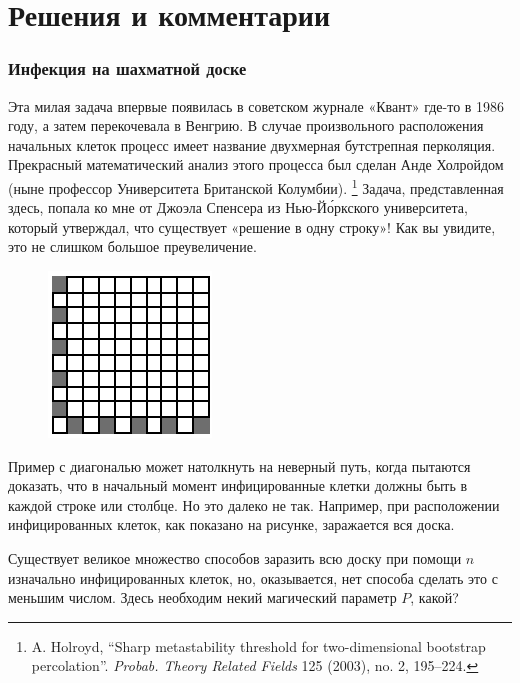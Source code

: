 \section*{Решения и комментарии}

\subsubsection*{Инфекция на шахматной доске}%

Эта милая задача впервые появилась в советском журнале «Квант» %
где-то в 1986 году, а затем перекочевала в Венгрию.
В случае произвольного расположения начальных клеток процесс имеет название двухмерная бутстрепная перколяция.
Прекрасный математический анализ этого процесса был сделан Анде Холройдом (ныне профессор Университета Британской Колумбии).%
\footnote{A. Holroyd, ``Sharp metastability threshold for two-dimensional bootstrap percolation''. \emph{Probab. Theory Related Fields} 125 (2003), no. 2, 195--224.}
Задача, представленная здесь, попала ко мне от Джоэла Спенсера %
из Нью-Й\'{о}ркского университета, который утверждал, что существует «решение в одну строку»!
Как вы увидите, это не слишком большое преувеличение.

\begin{figure}
\vskip-3mm
\centering
\includegraphics[scale=1.5]{Figs/Algorithms/sick}
\end{figure}

\medskip

Пример с диагональю может натолкнуть на неверный путь, когда пытаются доказать, что в начальный момент инфицированные клетки должны быть в каждой строке или столбце.
Но это далеко не так.
Например, при расположении инфицированных клеток, как показано на рисунке, заражается вся доска.


Существует великое множество способов заразить всю доску при помощи $n$ изначально инфицированных клеток, но, оказывается, нет способа сделать это с меньшим числом.
Здесь необходим некий магический параметр $P$, какой?

